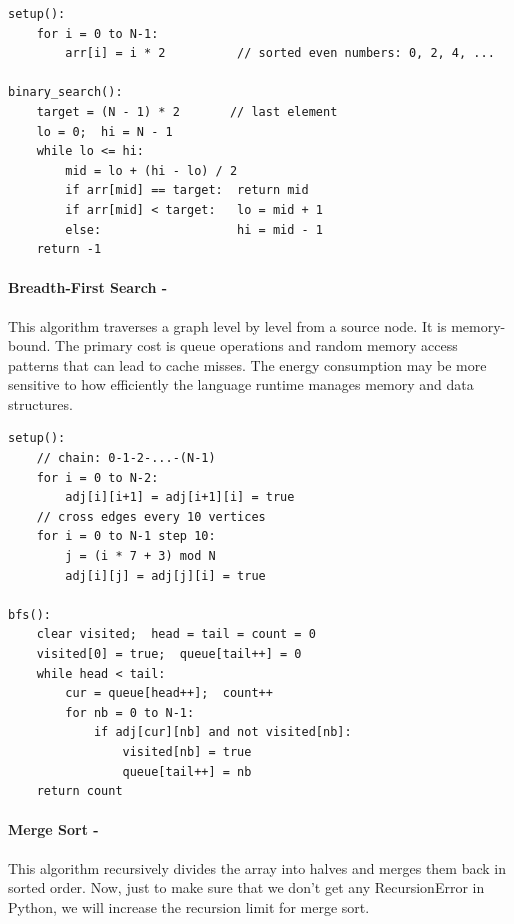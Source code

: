 \begin{lstlisting}[caption={Binary Search pseudocode}, label={lst:binary_search}, numbers=none]
setup():
    for i = 0 to N-1:
        arr[i] = i * 2          // sorted even numbers: 0, 2, 4, ...
 
binary_search():
    target = (N - 1) * 2       // last element
    lo = 0;  hi = N - 1
    while lo <= hi:
        mid = lo + (hi - lo) / 2
        if arr[mid] == target:  return mid
        if arr[mid] < target:   lo = mid + 1
        else:                   hi = mid - 1
    return -1
\end{lstlisting}


\paragraph{Breadth-First Search -}
    This algorithm traverses a graph level by level from a source node. It is memory-bound. The primary cost is queue operations and random memory access patterns that can lead to cache misses. The energy consumption may be more sensitive to how efficiently the language runtime manages memory and data structures.



\begin{lstlisting}[caption={Breadth-First Search pseudocode}, label={lst:bfs}, numbers=none]
setup():
    // chain: 0-1-2-...-(N-1)
    for i = 0 to N-2:
        adj[i][i+1] = adj[i+1][i] = true
    // cross edges every 10 vertices
    for i = 0 to N-1 step 10:
        j = (i * 7 + 3) mod N
        adj[i][j] = adj[j][i] = true
 
bfs():
    clear visited;  head = tail = count = 0
    visited[0] = true;  queue[tail++] = 0
    while head < tail:
        cur = queue[head++];  count++
        for nb = 0 to N-1:
            if adj[cur][nb] and not visited[nb]:
                visited[nb] = true
                queue[tail++] = nb
    return count
\end{lstlisting}



\paragraph{Merge Sort -}
    This algorithm recursively divides the array into halves and merges them back in sorted order. Now, just to make sure that we don't get any RecursionError in Python, we will increase the recursion limit for merge sort. 

